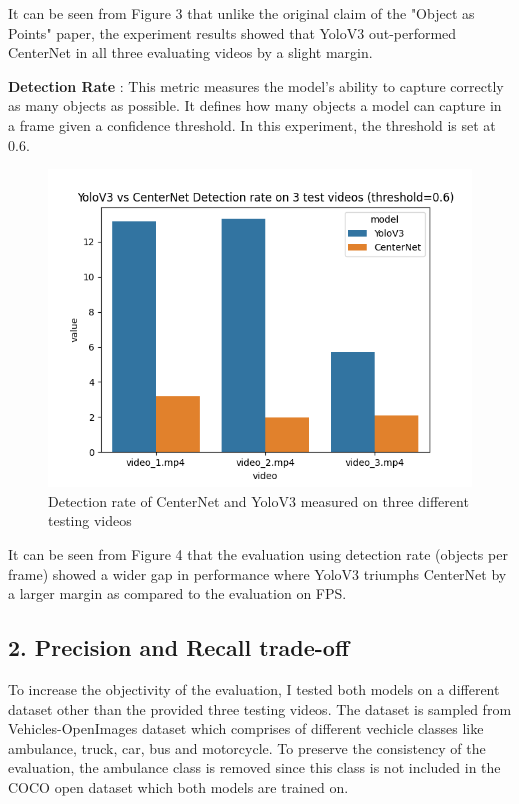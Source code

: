 \documentclass[12pt]{article}
\begin{document}
It can be seen from Figure 3 that unlike the original claim of the "Object as Points" paper, the experiment results showed that YoloV3 out-performed CenterNet in all three evaluating videos by a slight margin.\newline

\textbf{Detection Rate} : This metric measures the model's ability to capture correctly as many objects as possible. It defines how many objects a model can capture in a frame given a  confidence threshold. In this experiment, the threshold is set at 0.6.

\begin{figure}[H]
    \centering
    \captionsetup{justification=centering}
    \includegraphics[scale=0.8]{images/dr_yolo_vs_centernet.png}
    \caption{Detection rate of CenterNet and YoloV3 measured on three different testing videos}
\end{figure}

It can be seen from Figure 4 that the evaluation using detection rate (objects per frame) showed a wider gap in performance where YoloV3 triumphs CenterNet by a larger margin as compared to the evaluation on FPS. 

\subsection*{2. Precision and Recall trade-off}
To increase the objectivity of the evaluation, I tested both models on a different dataset other than the provided three testing videos. The dataset is sampled from Vehicles-OpenImages dataset which comprises of different vechicle classes like ambulance, truck, car, bus and motorcycle. To preserve the consistency of the evaluation, the ambulance class is removed since this class is not included in the COCO open dataset which both models are trained on.
\end{document}
